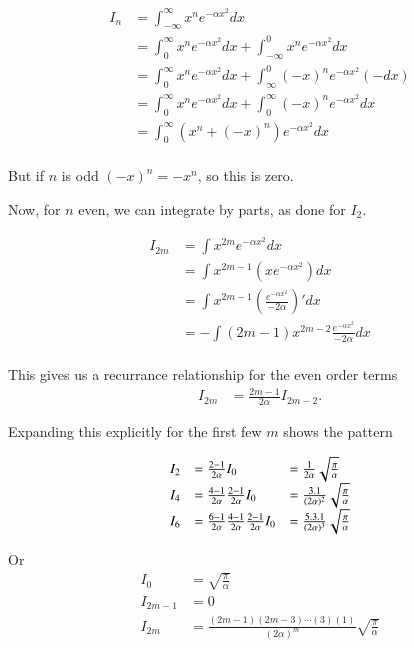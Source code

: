 \documentclass{article}
\begin{document}
\begin{align*}
I_n 
&= \int_{-\infty}^\infty x^n e^{-\alpha x^2} dx \\
&= \int_{0}^\infty x^n e^{-\alpha x^2} dx +\int_{-\infty}^0 x^n e^{-\alpha x^2} dx \\
&= \int_{0}^\infty x^n e^{-\alpha x^2} dx +\int_{\infty}^0 (-x)^n e^{-\alpha x^2} (-dx) \\
&= \int_{0}^\infty x^n e^{-\alpha x^2} dx +\int_0^{\infty} (-x)^n e^{-\alpha x^2} dx \\
&= \int_{0}^\infty (x^n + (-x)^n)e^{-\alpha x^2} dx \\
\end{align*}

But if $n$ is odd $(-x)^n = -x^n$, so this is zero.

Now, for $n$ even, we can integrate by parts, as done for $I_2$.

\begin{align*}
I_{2m}
&= \int x^{2m} e^{-\alpha x^2} dx \\
&= \int x^{2m-1} \left(x e^{-\alpha x^2}\right) dx \\
&= \int x^{2m-1} \left(\frac{e^{-\alpha x^2}}{-2\alpha}\right)' dx \\
&= -\int (2m-1) x^{2m-2} \frac{e^{-\alpha x^2}}{-2\alpha} dx \\
\end{align*}

This gives us a recurrance relationship for the even order terms
\begin{align}
I_{2m} &= \frac{2m-1}{2\alpha} I_{2m-2}.
\end{align}

Expanding this explicitly for the first few $m$ shows the pattern

\begin{align*}
\begin{array}{l l l}
I_2 &= \frac{2-1}{2\alpha} I_0 &= \frac{1}{2\alpha} \sqrt{\frac{\pi}{\alpha}} \\
I_4 &= \frac{4-1}{2\alpha}\frac{2-1}{2\alpha} I_0 &= \frac{3.1}{(2\alpha)^2} \sqrt{\frac{\pi}{\alpha}} \\
I_6 &= \frac{6-1}{2\alpha}\frac{4-1}{2\alpha}\frac{2-1}{2\alpha} I_0 &= \frac{5.3.1}{(2\alpha)^3} \sqrt{\frac{\pi}{\alpha}} \\
\end{array}
\end{align*}

Or
\begin{align}
I_{0} &= \sqrt{\frac{\pi}{\alpha}} \\
I_{2m-1} &= 0 \\
I_{2m} &= \frac{(2m-1)(2m-3)\cdots(3)(1)}{(2\alpha)^m} \sqrt{\frac{\pi}{\alpha}}
\end{align}



\end{document}

